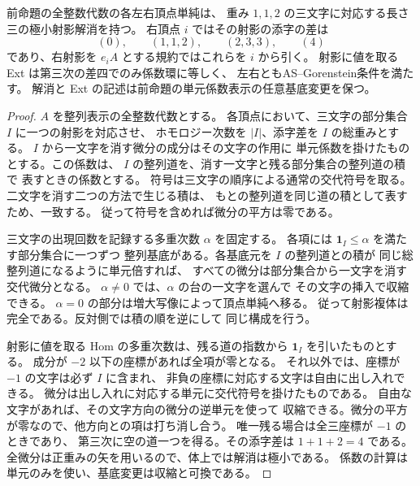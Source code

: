 \begin{corollary}[整列表示の左右頂点単純とAS双対]
\label{cor:qa-avatar-diagonal-boundary-simple}
前命題の全整数代数の各左右頂点単純は、
重み $1,1,2$ の三文字に対応する長さ三の極小射影解消を持つ。
右頂点 $i$ ではその射影の添字の差は
\[
 (0),\qquad(1,1,2),\qquad(2,3,3),\qquad(4)
\]
であり、右射影を $e_iA$ とする規約ではこれらを $i$ から引く。
射影に値を取る Ext は第三次の差四でのみ係数環に等しく、
左右ともAS--Gorenstein条件を満たす。
解消と Ext の記述は前命題の単元係数表示の任意基底変更を保つ。
\end{corollary}
\begin{proof}
$A$ を整列表示の全整数代数とする。
各頂点において、三文字の部分集合 $I$ に一つの射影を対応させ、
ホモロジー次数を $|I|$、添字差を $I$ の総重みとする。
$ I$ から一文字を消す微分の成分はその文字の作用に
単元係数を掛けたものとする。この係数は、
$I$ の整列道を、消す一文字と残る部分集合の整列道の積で
表すときの係数とする。
符号は三文字の順序による通常の交代符号を取る。
二文字を消す二つの方法で生じる積は、
もとの整列道を同じ道の積として表すため、一致する。
従って符号を含めれば微分の平方は零である。

三文字の出現回数を記録する多重次数 $\alpha$ を固定する。
各項には $\mathbf 1_I\leq\alpha$ を満たす部分集合に一つずつ
整列基底がある。各基底元を $I$ の整列道との積が
同じ総整列道になるように単元倍すれば、
すべての微分は部分集合から一文字を消す交代微分となる。
$\alpha\ne0$ では、$\alpha$ の台の一文字を選んで
その文字の挿入で収縮できる。
$\alpha=0$ の部分は増大写像によって頂点単純へ移る。
従って射影複体は完全である。反対側では積の順を逆にして
同じ構成を行う。

射影に値を取る Hom の多重次数は、残る道の指数から
$\mathbf 1_I$ を引いたものとする。
成分が $-2$ 以下の座標があれば全項が零となる。
それ以外では、座標が $-1$ の文字は必ず $I$ に含まれ、
非負の座標に対応する文字は自由に出し入れできる。
微分は出し入れに対応する単元に交代符号を掛けたものである。
自由な文字があれば、その文字方向の微分の逆単元を使って
収縮できる。微分の平方が零なので、他方向との項は打ち消し合う。
唯一残る場合は全三座標が $-1$ のときであり、
第三次に空の道一つを得る。その添字差は $1+1+2=4$ である。
全微分は正重みの矢を用いるので、体上では解消は極小である。
係数の計算は単元のみを使い、基底変更は収縮と可換である。
\end{proof}

